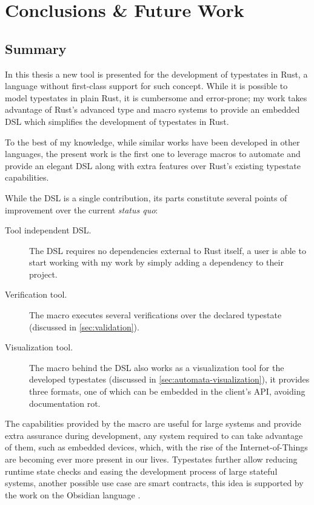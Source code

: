 

\chapter{Conclusions \& Future Work}\label{cha:conclusions}

\section{Summary}

In this thesis a new tool is presented for the development of typestates in Rust,
a language without first-class support for such concept.
While it is possible to model typestates in plain Rust, it is cumbersome and error-prone;
my work takes advantage of Rust's advanced type and macro systems
to provide an embedded DSL which simplifies the development of typestates in Rust.

To the best of my knowledge, while similar works have been developed in other languages,
the present work is the first one to leverage macros to automate
and provide an elegant DSL along with extra features over Rust's existing typestate capabilities.

While the DSL is a single contribution, its parts constitute several points of improvement over the current \emph{status quo}:
\begin{description}
    \item[Tool independent DSL.] The DSL requires no dependencies external to Rust itself,
    a user is able to start working with my work by simply adding a dependency to their project.
    \item[Verification tool.] The macro executes several verifications over the declared typestate (discussed in \autoref{sec:validation}).
    \item[Visualization tool.] The macro behind the DSL also works as a visualization tool for the developed typestates (discussed in \autoref{sec:automata-visualization}),
    it provides three formats, one of which can be embedded in the client's API, avoiding documentation rot.
\end{description}

The capabilities provided by the macro are useful for large systems and provide extra assurance during development,
any system required to  can take advantage of them,
such as embedded devices, which, with the rise of the Internet-of-Things are becoming ever more present in our lives.
Typestates further allow reducing runtime state checks and easing the development process of large stateful systems,
another possible use case are smart contracts, this idea is supported by the work on the Obsidian language \autocite{Coblenz2020a, Coblenz2020}.

